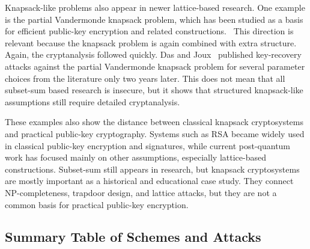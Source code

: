 Knapsack-like problems also appear in newer lattice-based research. One example
is the partial Vandermonde knapsack problem, which has been studied as a basis
for efficient public-key encryption and related
constructions.~\cite{BoudgoustSakzadSteinfeld2022} This direction is relevant
because the knapsack problem is again combined with extra structure. Again, the
cryptanalysis followed quickly. Das and Joux~\cite{DasJoux2024} published key-recovery attacks against
the partial Vandermonde knapsack problem for several parameter choices from the
literature only two years later. This does not mean that all
subset-sum based research is insecure, but it shows that structured
knapsack-like assumptions still require detailed cryptanalysis.

These examples also show the distance between classical knapsack cryptosystems
and practical public-key cryptography. Systems such as RSA became widely used
in classical public-key encryption and signatures, while current post-quantum
work has focused mainly on other assumptions, especially lattice-based
constructions. Subset-sum still appears in research, but knapsack
cryptosystems are mostly important as a historical and educational case study.
They connect NP-completeness, trapdoor design, and lattice attacks, but they
are not a common basis for practical public-key encryption.

\subsection{Summary Table of Schemes and Attacks}

